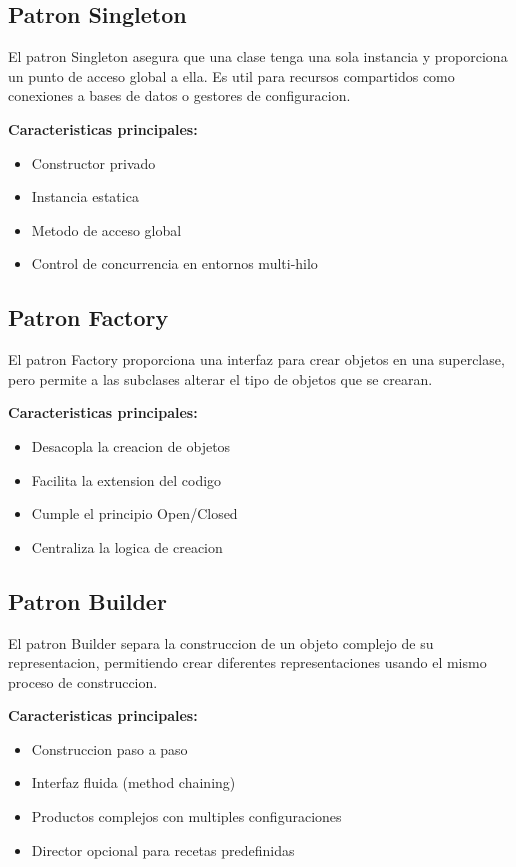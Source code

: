 \documentclass[11pt,a4paper]{article}
\begin{document}
\subsection{Patron Singleton}

El patron Singleton asegura que una clase tenga una sola instancia y proporciona un punto de acceso global a ella. Es util para recursos compartidos como conexiones a bases de datos o gestores de configuracion.

\textbf{Caracteristicas principales:}
\begin{itemize}
    \item Constructor privado
    \item Instancia estatica
    \item Metodo de acceso global
    \item Control de concurrencia en entornos multi-hilo
\end{itemize}

\subsection{Patron Factory}

El patron Factory proporciona una interfaz para crear objetos en una superclase, pero permite a las subclases alterar el tipo de objetos que se crearan.

\textbf{Caracteristicas principales:}
\begin{itemize}
    \item Desacopla la creacion de objetos
    \item Facilita la extension del codigo
    \item Cumple el principio Open/Closed
    \item Centraliza la logica de creacion
\end{itemize}

\subsection{Patron Builder}

El patron Builder separa la construccion de un objeto complejo de su representacion, permitiendo crear diferentes representaciones usando el mismo proceso de construccion.

\textbf{Caracteristicas principales:}
\begin{itemize}
    \item Construccion paso a paso
    \item Interfaz fluida (method chaining)
    \item Productos complejos con multiples configuraciones
    \item Director opcional para recetas predefinidas
\end{itemize}
\end{document}
